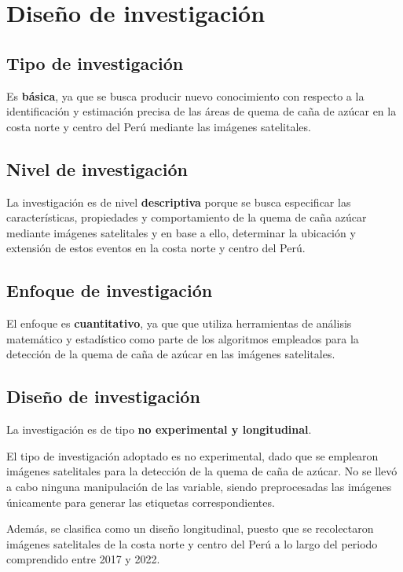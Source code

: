 \section{Diseño de investigación}
\subsection{Tipo de investigación}
Es \textbf{básica}, ya que se busca producir nuevo conocimiento con respecto a la identificación y estimación precisa de las áreas 
de quema de caña de azúcar en la costa norte y centro del Perú mediante las imágenes satelitales.

\subsection{Nivel de investigación}
La investigación es de nivel \textbf{descriptiva} porque se busca especificar las características, propiedades y comportamiento 
de la quema de caña azúcar mediante imágenes satelitales y en base a ello, determinar la ubicación y extensión de estos
eventos en la costa norte y centro del Perú. 

\subsection{Enfoque de investigación}
El enfoque es \textbf{cuantitativo}, ya que que utiliza herramientas de análisis matemático y estadístico como parte de los
algoritmos empleados para la detección de la quema de caña de azúcar en las imágenes satelitales.

\subsection{Diseño de investigación}
La investigación es de tipo \textbf{no experimental y longitudinal}.

El tipo de investigación adoptado es no experimental, dado que se emplearon imágenes satelitales 
para la detección de la quema de caña de azúcar. No se llevó a cabo ninguna manipulación 
de las variable, siendo preprocesadas las imágenes únicamente para generar las etiquetas correspondientes. 

Además, se clasifica como un diseño longitudinal, puesto que se recolectaron imágenes satelitales de la costa norte 
y centro del Perú a lo largo del periodo comprendido entre 2017 y 2022.
